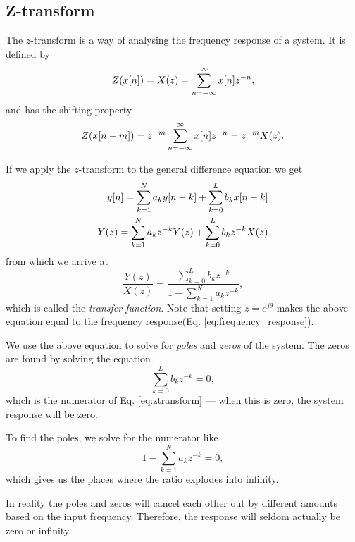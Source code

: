 \documentclass[11pt]{article}
\let\originalleft\left
\let\originalright\right
\renewcommand{\left}{\mathopen{}\mathclose\bgroup\originalleft}
\renewcommand{\right}{\aftergroup\egroup\originalright}
\def\lsqb{\left[}
\def\rsqb{\right]}
\def\sqb#1{\lsqb #1 \rsqb}
\def\xsig{x\sqb{n}}
\def\ysig{y\sqb{n}}
\begin{document}
\subsection{Z-transform}
The $z$-transform is a way of analysing the frequency response of a system. It is defined by
\begin{equation}
    Z(\xsig) = X(z) = \sum_{n=-\infty}^{\infty} \xsig z^{-n},
\end{equation}
and has the shifting property
\begin{equation}
    Z(x\sqb{n-m}) = z^{-m} \sum_{n=-\infty}^{\infty} x\sqb{n} z^{-n} = z^{-m} X(z).
\end{equation}

If we apply the $z$-transform to the general difference equation we get
\begin{align}
    \ysig = \sum_{k=1}^N a_k y\sqb{n-k} + \sum_{k=0}^L b_k x\sqb{n-k} \\
    Y(z) = \sum_{k=1}^N a_k z^{-k} Y(z) + \sum_{k=0}^L b_k z^{-k} X(z) \\
\end{align}
from which we arrive at
\begin{equation}
    \label{eq:ztransform}
    \frac{Y(z)}{X(z)} = \frac{\sum_{k=0}^L b_k z^{-k}}{1 - \sum_{k=1}^N a_k z^{-k}},
\end{equation}
which is called the \textit{transfer function}. Note that setting $z = e^{j\theta}$ makes the above equation equal to the frequency response(Eq. \ref{eq:frequency_response}).

We use the above equation to solve for \textit{poles} and \textit{zeros} of the system. The zeros are found by solving the equation
\begin{equation}
    \sum_{k=0}^L b_k z^{-k} = 0,
\end{equation}
which is the numerator of Eq. \ref{eq:ztransform} --- when this is zero, the system response will be zero.

To find the poles, we solve for the numerator like
\begin{equation}
    1 - \sum_{k=1}^N a_k z^{-k} = 0,
\end{equation}
which gives us the places where the ratio explodes into infinity.

In reality the poles and zeros will cancel each other out by different amounts based on the input frequency. Therefore, the response will seldom actually be zero or infinity.
\end{document}
